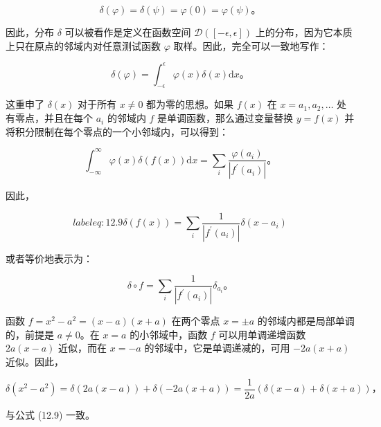 $$
\delta(\varphi) = \delta(\psi) = \varphi(0) = \varphi(\psi)。
$$

因此，分布 $\delta$ 可以被看作是定义在函数空间
$\mathcal{D}([-\epsilon, \epsilon])$
上的分布，因为它本质上只在原点的邻域内对任意测试函数 $\varphi$
取样。因此，完全可以一致地写作：

$$
\delta(\varphi) = \int_{-\epsilon}^\epsilon \varphi(x) \delta(x) \mathrm{d}x。
$$

这重申了 $\delta(x)$ 对于所有 $x \neq 0$ 都为零的思想。如果 $f(x)$
在 $x = a_1, a_2, \ldots$ 处有零点，并且在每个 $a_i$ 的邻域内 $f$
是单调函数，那么通过变量替换 $y = f(x)$
并将积分限制在每个零点的一个小邻域内，可以得到：

$$
\int_{-\infty}^\infty \varphi(x) \delta(f(x)) \mathrm{d}x = \sum_{i} \frac{\varphi(a_i)}{\left|f^{\prime}(a_i)\right|}。
$$

因此，

\begin{equation}label{eq:12.9}
 \delta(f(x)) = \sum_{i} \frac{1}{\left|f^{\prime}(a_i)\right|} \delta(x - a_i) 
 \end{equation}

或者等价地表示为：

$$
\delta \circ f = \sum_{i} \frac{1}{\left|f^{\prime}(a_i)\right|} \delta_{a_i}。
$$

\begin{eg} \label{eg:12.7} 
函数 $f = x^2 - a^2 = (x - a)(x + a)$ 在两个零点
$x = \pm a$ 的邻域内都是局部单调的，前提是 $a \neq 0$。在 $x = a$
的小邻域中，函数 $f$ 可以用单调递增函数 $2a(x - a)$ 近似，而在
$x = -a$ 的邻域中，它是单调递减的，可用 $-2a(x + a)$ 近似。因此，

$$
\delta(x^2 - a^2) = \delta(2a(x - a)) + \delta(-2a(x + a)) = \frac{1}{2a}(\delta(x - a) + \delta(x + a))，
$$

与公式 (12.9) 一致。
\end{eg}

